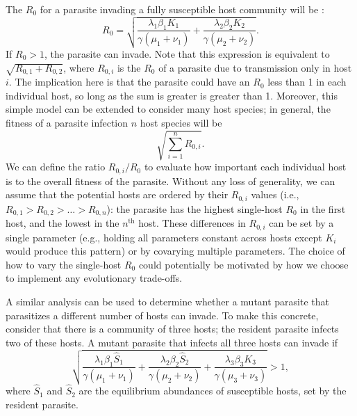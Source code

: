 \documentclass[11pt,reqno,final,pdftex]{amsart}\usepackage[]{graphicx}\usepackage[]{color}
\theoremstyle{plain}
\numberwithin{equation}{part}
\begin{document}
The $R_0$ for a parasite invading a fully susceptible host community will be \citep{Dobson2004,Fenton2015}:
\begin{equation}
R_0 = \sqrt{\frac{\lambda_1 \beta_1 K_1}{\gamma(\mu_1 + \nu_1)} + \frac{\lambda_2 \beta_2 K_2}{\gamma(\mu_2 + \nu_2)}}.
\end{equation}
If $R_0 > 1$, the parasite can invade.
Note that this expression is equivalent to $\sqrt{R_{0,1} + R_{0,2}}$, where $R_{0,i}$ is the $R_0$ of a parasite due to transmission only in host $i$.
The implication here is that the parasite could have an $R_0$ less than 1 in each individual host, so long as the sum is greater is greater than 1.
Moreover, this simple model can be extended to consider many host species; in general, the fitness of a parasite infection $n$ host species will be
\begin{equation}
\sqrt{\sum_{i=1}^n R_{0,i}}.
\end{equation}
We can define the ratio $R_{0,i}/R_0$ to evaluate how important each individual host is to the overall fitness of the parasite.
Without any loss of generality, we can assume that the potential hosts are ordered by their $R_{0,i}$ values (i.e., $R_{0,1} > R_{0,2} > \dots > R_{0,n}$): the parasite has the highest single-host $R_0$ in the first host, and the lowest in the $n^{\text{th}}$ host.
These differences in $R_{0,i}$ can be set by a single parameter (e.g., holding all parameters constant across hosts except $K_i$ would produce this pattern) or by covarying multiple parameters.
The choice of how to vary the single-host $R_0$ could potentially be motivated by how we choose to implement any evolutionary trade-offs.

A similar analysis can be used to determine whether a mutant parasite that parasitizes a different number of hosts can invade.
To make this concrete, consider that there is a community of three hosts; the resident parasite infects two of these hosts.
A mutant parasite that infects all three hosts can invade if
\begin{equation}\label{eq:invasion}
\sqrt{\frac{\lambda_1 \beta_1 \hat{S}_1}{\gamma(\mu_1 + \nu_1)} + \frac{\lambda_2 \beta_2 \hat{S}_2}{\gamma(\mu_2 + \nu_2)} + \frac{\lambda_3 \beta_3 K_3}{\gamma(\mu_3 + \nu_3)}} > 1,
\end{equation}
where $\hat{S}_1$ and $\hat{S}_2$ are the equilibrium abundances of susceptible hosts, set by the resident parasite.
\end{document}
